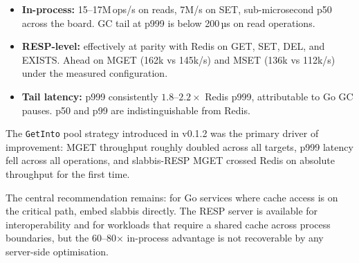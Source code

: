\documentclass[a4paper,11pt]{article}
\begin{document}
\begin{itemize}
  \item \textbf{In-process:} 15--17M\,ops/s on reads, 7M/s on SET,
        sub-microsecond p50 across the board. GC tail at p999 is below 200\,µs
        on read operations.

  \item \textbf{RESP-level:} effectively at parity with Redis on GET, SET, DEL,
        and EXISTS. Ahead on MGET (162k vs 145k/s) and MSET (136k vs 112k/s)
        under the measured configuration.

  \item \textbf{Tail latency:} p999 consistently $1.8\text{--}2.2\times$ Redis
        p999, attributable to Go GC pauses. p50 and p99 are indistinguishable
        from Redis.
\end{itemize}

The \texttt{GetInto} pool strategy introduced in v0.1.2 was the primary driver
of improvement: MGET throughput roughly doubled across all targets, p999
latency fell across all operations, and slabbis-RESP MGET crossed Redis on
absolute throughput for the first time.

The central recommendation remains: for Go services where cache access is on
the critical path, embed slabbis directly. The RESP server is available for
interoperability and for workloads that require a shared cache across process
boundaries, but the 60--80$\times$ in-process advantage is not recoverable by
any server-side optimisation.
\end{document}
